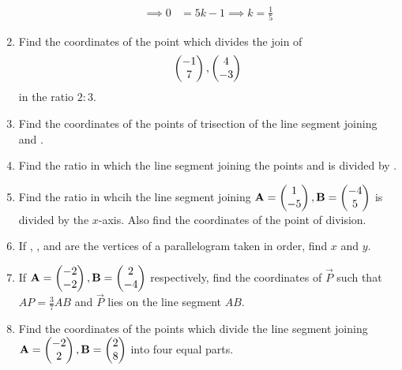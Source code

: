 \documentclass[journal,12pt,twocolumn]{IEEEtran}
\renewcommand\thesection{\arabic{section}}
\begin{document}
\begin{enumerate}[label=\thesection.\arabic*.,ref=\thesection.\theenumi]
\begin{align}
\\
\implies 0 &= 5k-1 \implies k = \frac{1}{5}
\end{align}
%
\item Find the coordinates of the point which divides the join of 
\begin{align}
\begin{pmatrix}-1\\7\end{pmatrix},  \begin{pmatrix}4\\-3\end{pmatrix}
\end{align}
%
in the ratio $2:3$.
\\
\solution
%

\item Find the coordinates of the points of trisection of the line segment joining  and .
\\
\solution
%
\item Find the ratio in which the line segment joining the points  and  is divided by .
\\
\solution
%
\item Find the ratio in whcih the line segment joining $\mathbf{A}=\begin{pmatrix}1\\-5\end{pmatrix}, \mathbf{B}=\begin{pmatrix}-4\\5\end{pmatrix}$ is divided by the $x$-axis.  Also find the coordinates of the point of division.
\\
\solution
%
\item If , ,  and  are the vertices of a parallelogram taken in order, find $x$ and $y$.
\\
\solution
%
\item If $\mathbf{A}=\begin{pmatrix}-2\\-2\end{pmatrix}, \mathbf{B}=\begin{pmatrix}2\\-4\end{pmatrix}$ respectively, find the coordinates of $\vec{P}$ such that $AP = \frac{3}{7}AB$ and $\vec{P}$ lies on the line segment $AB$.
\\
\solution
%
\item Find the coordinates of the points which divide the line segment joining $\mathbf{A}=\begin{pmatrix}-2\\2\end{pmatrix}, \mathbf{B}=\begin{pmatrix}2\\8\end{pmatrix}$ into four equal parts.
\\
\solution
%
\end{enumerate}
\end{document}
